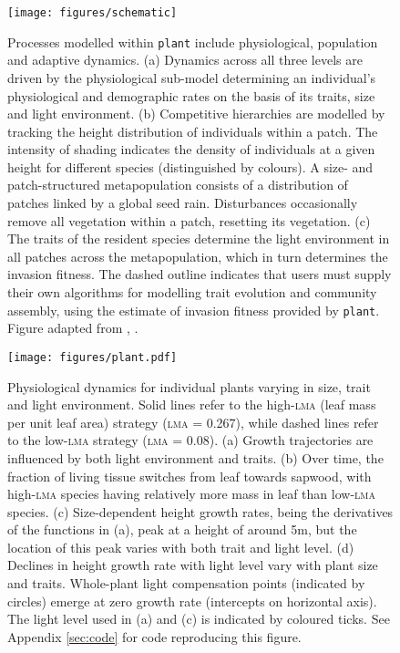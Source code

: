 \documentclass[a4paper,11pt]{article}
\newcommand{\plant}{\texttt{plant}}
\begin{document}
\begin{figure}[h!]
\centering
\texttt{[image: figures/schematic]}

\caption{Processes modelled within {\plant} include physiological, population and
adaptive dynamics.
(a) Dynamics across all three levels are driven by the
physiological sub-model determining an individual's physiological and
demographic rates on the basis of its traits, size and light environment.
(b) Competitive hierarchies are modelled by tracking the height distribution of
individuals within a patch. The intensity
of shading indicates the density of individuals at a given height for
different species (distinguished by colours). A size- and patch-structured
metapopulation consists of a distribution of patches linked by a global seed rain.
Disturbances occasionally remove all vegetation within a patch, resetting its vegetation. (c) The traits of the resident species determine the light environment
in all patches across the metapopulation, which in turn determines the invasion fitness.
The dashed outline indicates that users must supply their own algorithms for
modelling trait evolution and community assembly, using the estimate of
invasion fitness provided by {\plant}. Figure adapted from
\citet{Falster-2011}, \citet{Falster-2015}.
}

\label{fig:schematic}
\end{figure}

\newpage

\begin{figure}[h!]
\centering
\texttt{[image: figures/plant.pdf]}
\caption{Physiological dynamics for individual plants varying in size,
 trait and light environment. Solid lines refer to the high-\textsc{lma} (leaf mass per unit leaf area) strategy (\textsc{lma} =
 0.267), while dashed lines refer to the low-\textsc{lma} strategy
 (\textsc{lma} = 0.08). (a) Growth trajectories are influenced by
 both light environment and traits. (b) Over time, the fraction of
 living tissue switches from leaf towards sapwood, with high-\textsc{lma} species having relatively more mass in leaf than low-\textsc{lma} species. (c)
 Size-dependent height growth rates, being the derivatives of the functions in (a), peak at a height of around
 5m, but the location of this peak varies with both trait and light
 level. (d) Declines in height growth rate with light level vary with plant size
 and traits. Whole-plant light compensation points (indicated by
 circles) emerge at zero growth rate (intercepts on horizontal axis).
 The light level used in (a) and (c) is indicated by
 coloured ticks. See Appendix \ref{sec:code} for code
 reproducing this figure.}
\label{fig:plant}
\end{figure}
\end{document}

